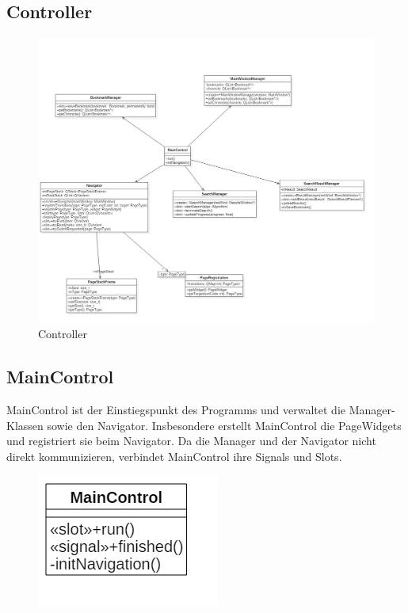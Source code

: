 \pagebreak

\subsection{Controller}

\begin{figure}[H]
\includegraphics[width=1\linewidth]{img/Klassendiagramm/Controller}
\caption{Controller}
\label{fig:controller}
\end{figure}


\subsection*{MainControl}
MainControl ist der Einstiegspunkt des Programms und verwaltet die Manager-Klassen sowie den Navigator. Insbesondere erstellt MainControl die PageWidgets und registriert sie beim Navigator.
Da die Manager und der Navigator nicht direkt kommunizieren, verbindet MainControl ihre Signals und Slots.

\begin{figure}[H]
\centering
\includegraphics[scale=0.5]{img/Klassendiagramm/Klassen/Controller/MainControl}
\label{fig:mainControl}
\end{figure}

